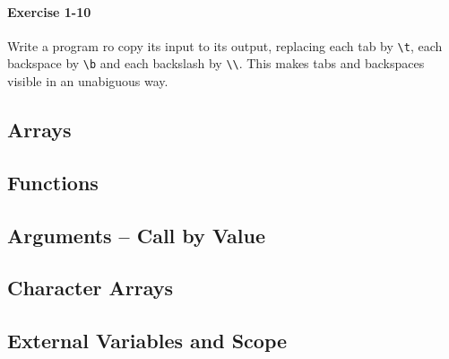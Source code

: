 		\paragraph{Exercise 1-10}
			Write a program ro copy its input to its output, replacing each tab by
			\lstinline{\t}, each backspace by \lstinline{\b} and each backslash by
			\lstinline{\\}. This makes tabs and backspaces visible in an unabiguous
			way.

			\hfill{}\cite[p.~20]{knr}
			

	\subsection{Arrays}
	\subsection{Functions}
	\subsection{Arguments -- Call by Value}
	\subsection{Character Arrays}
	\subsection{External Variables and Scope}
